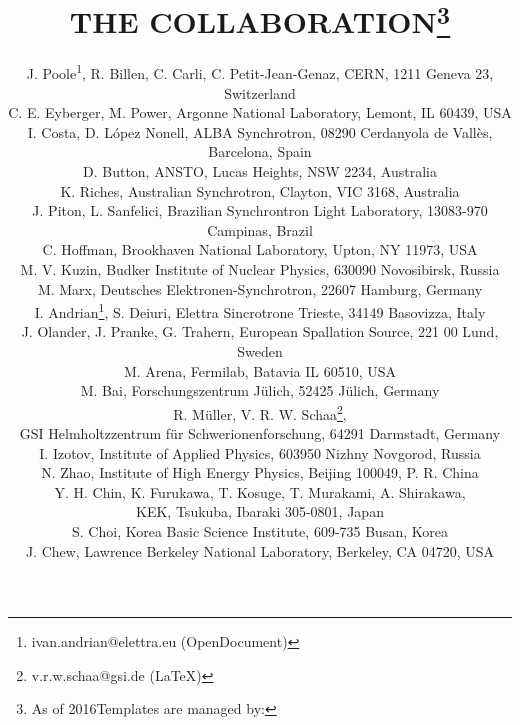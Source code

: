\documentclass[a4paper,
]{jacow}
\begin{document}
	\title{THE  COLLABORATION\thanks{As of 2016\newline \hspace*{-.8em}Templates are managed by:}}

	\author{J. Poole\textsuperscript{1}, R. Billen, C. Carli, C. Petit-Jean-Genaz, CERN, 1211 Geneva 23,
		 	Switzerland \\
		C. E. Eyberger, M. Power, Argonne National Laboratory, Lemont, IL 60439, USA \\
		I. Costa, D. López Nonell, ALBA Synchrotron, 08290 Cerdanyola de Vallès, Barcelona, Spain \\
		D. Button, ANSTO, Lucas Heights, NSW 2234, Australia \\
		K. Riches, Australian Synchrotron, Clayton, VIC 3168, Australia \\
		J. Piton, L. Sanfelici, Brazilian Synchrontron Light Laboratory, 13083-970 Campinas, Brazil \\
		C. Hoffman, Brookhaven National Laboratory, Upton, NY 11973, USA \\
		M. V. Kuzin, Budker Institute of Nuclear Physics, 630090 Novosibirsk, Russia \\
		M. Marx, Deutsches Elektronen-Synchrotron, 22607 Hamburg, Germany \\
		I. Andrian\thanks{ivan.andrian@elettra.eu (OpenDocument)}, 
				  S. Deiuri, Elettra Sincrotrone Trieste, 34149 Basovizza, Italy \\
		J. Olander, J. Pranke, G. Trahern, European Spallation Source, 221 00 Lund, Sweden \\
		M. Arena, Fermilab, Batavia IL 60510, USA \\
		M. Bai, Forschungszentrum Jülich, 52425 Jülich, Germany \\
		R. Müller, V. R. W. Schaa\thanks{v.r.w.schaa@gsi.de (\LaTeX)}, \\
		GSI Helmholtzzentrum für Schwerionenforschung, 64291 Darmstadt, Germany \\
		I. Izotov, Institute of Applied Physics, 603950 Nizhny Novgorod, Russia \\
		N. Zhao, Institute of High Energy Physics, Beijing 100049, P. R. China \\
		Y. H. Chin, K. Furukawa, T. Kosuge, T. Murakami, A. Shirakawa, \\
		KEK, Tsukuba, Ibaraki 305-0801, Japan \\
		S. Choi, Korea Basic Science Institute, 609-735 Busan, Korea \\
		J. Chew, Lawrence Berkeley National Laboratory, Berkeley, CA 04720, USA \\
}
\end{document}

